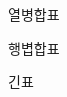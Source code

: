 \documentclass[10pt,xcolor=pdftex,dvipsnames,table,handout]{beamer}
\begin{document}
		\begin{frame}[t]{열병합표}

		\end{frame}

		\begin{frame}[t]{행볍합표}

		\end{frame}


		\begin{frame}[t]{긴표}

		\end{frame}
\end{document}
